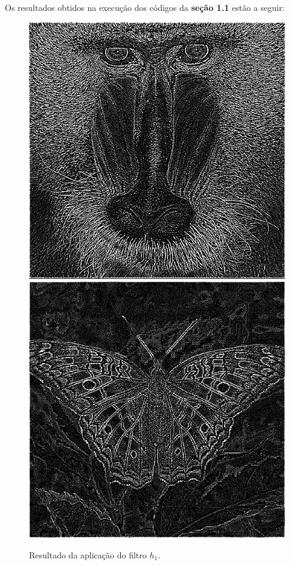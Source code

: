 \documentclass[twoside,twocolumn]{article}
\begin{document}
Os resultados obtidos na execução dos códigos da \textbf{seção 1.1} estão a seguir:

\begin{figure}[H]
\begin{center}
	\includegraphics[scale=.19]{figures/baboon_h1.png}
	\includegraphics[scale=.19]{figures/butterfly_h1.png}
\caption{Resultado da aplicação do filtro $h_{1}$.} \label{gdimotes}
\end{center}
\end{figure}
\end{document}
